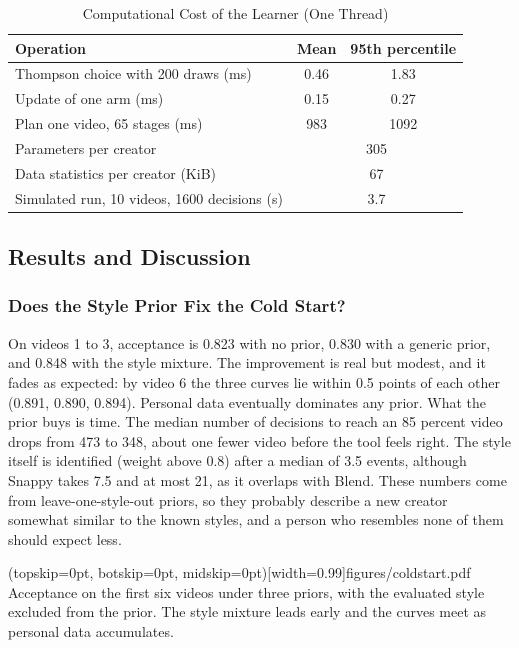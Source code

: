 \documentclass{ieeeaccess}
\begin{document}
\begin{table}[t]
\caption{Computational Cost of the Learner (One Thread)}
\label{tab:runtime}
\setlength{\tabcolsep}{4pt}
\centering
\begin{tabular}{|l|c|c|}
\hline
Operation & Mean & 95th percentile \\
\hline
Thompson choice with 200 draws (ms) & 0.46 & 1.83 \\
Update of one arm (ms) & 0.15 & 0.27 \\
Plan one video, 65 stages (ms) & 983 & 1092 \\
\hline
Parameters per creator & \multicolumn{2}{c|}{305} \\
Data statistics per creator (KiB) & \multicolumn{2}{c|}{67} \\
Simulated run, 10 videos, 1600 decisions (s) & \multicolumn{2}{c|}{3.7} \\
\hline
\end{tabular}
\end{table}

\subsection{Results and Discussion}

\subsubsection{Does the Style Prior Fix the Cold Start?}
On videos 1 to 3, acceptance is 0.823 with no prior, 0.830 with a generic prior, and 0.848 with the style mixture. The improvement is real but modest, and it fades as expected: by video 6 the three curves lie within 0.5 points of each other (0.891, 0.890, 0.894). Personal data eventually dominates any prior. What the prior buys is time. The median number of decisions to reach an 85 percent video drops from 473 to 348, about one fewer video before the tool feels right. The style itself is identified (weight above 0.8) after a median of 3.5 events, although Snappy takes 7.5 and at most 21, as it overlaps with Blend. These numbers come from leave-one-style-out priors, so they probably describe a new creator somewhat similar to the known styles, and a person who resembles none of them should expect less.

\Figure[t!](topskip=0pt, botskip=0pt, midskip=0pt)[width=0.99\columnwidth]{figures/coldstart.pdf}
{Acceptance on the first six videos under three priors, with the evaluated style excluded from the prior. The style mixture leads early and the curves meet as personal data accumulates.\label{fig:cold}}
\end{document}
